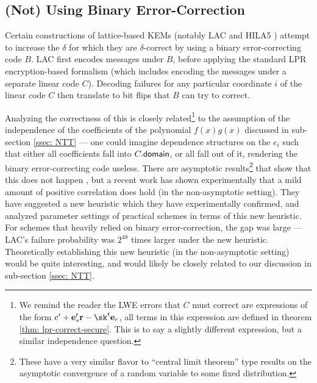 {\subsection{(Not) Using Binary Error-Correction}\label{ssec: independence}
Certain constructions of lattice-based KEMs (notably LAC and HILA5 \cite{SAC:Saarinen17}) attempt to increase the $\delta$ for which they are $\delta$-correct by using a binary error-correcting code $B$.
LAC first encodes messages under $B$, before applying the standard LPR encryption-based formalism (which includes encoding the messages under a separate linear code $C$).
Decoding failures for any particular coordinate $i$ of the linear code $C$ then translate to bit flips that $B$ can try to correct.

Analyzing the correctness of this is closely related\footnote{We remind the reader the LWE errors that $C$ must correct are expressions of the form $e' + \vfont{e}_s^t\vfont{r} - \sk^t\vfont{e}_r$, all terms in this expression are defined in theorem \ref{thm: lpr-correct-secure}.
This is to say a slightly different expression, but a similar independence question.} to the assumption of the independence of the coefficients of the polynomial $f(x)g(x)$ discussed in sub-section \ref{ssec: NTT} --- one could imagine dependence structures on the $e_i$ such that either all coefficients fall into $C.\mathsf{domain}$, or all fall out of it, rendering the binary error-correcting code useless.
There are asymptotic results\footnote{These have a very similar flavor to ``central limit theorem'' type results on the asymptotic convergence of a random variable to some fixed distribution.} that show that this does not happen \cite{EPRINT:JinZha17}, but a recent work \cite{PQCRYPTO:DAnVerVer19} has shown experimentally that a mild amount of positive correlation does hold (in the non-asymptotic setting).
They have suggested a new heuristic which they have experimentally confirmed, and analyzed parameter settings of practical schemes in terms of this new heuristic.
For schemes that heavily relied on binary error-correction, the gap was large --- LAC's failure probability was $2^{48}$ times larger under the new heuristic.
Theoretically establishing this new heuristic (in the non-asymptotic setting) would be quite interesting, and would likely be closely related to our discussion in sub-section \ref{ssec: NTT}.
}